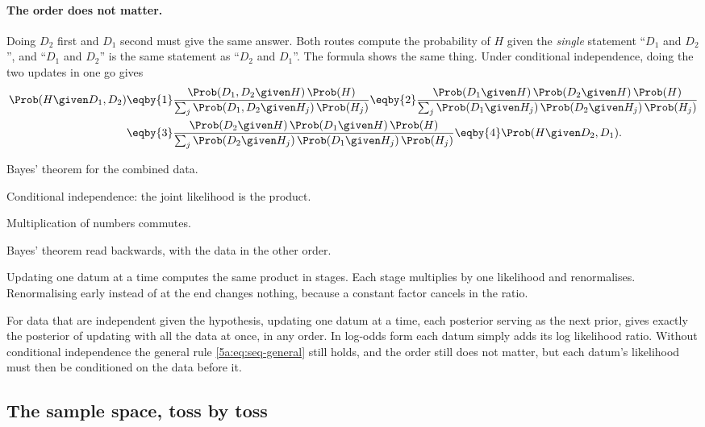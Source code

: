 \paragraph{The order does not matter.}
Doing $D_2$ first and $D_1$ second must give the same answer. Both routes compute
the probability of $H$ given the \emph{single} statement ``$D_1$ and $D_2$'', and
``$D_1$ and $D_2$'' is the same statement as ``$D_2$ and $D_1$''. The formula shows
the same thing. Under conditional independence, doing the two updates in one go
gives 
\begin{align*}
  \Prob(H\given D_1,D_2)
  &\eqby{1}\frac{\Prob(D_1,D_2\given H)\,\Prob(H)}{\sum_j\Prob(D_1,D_2\given H_j)\,\Prob(H_j)}
  \eqby{2}\frac{\Prob(D_1\given H)\,\Prob(D_2\given H)\,\Prob(H)}
              {\sum_j\Prob(D_1\given H_j)\,\Prob(D_2\given H_j)\,\Prob(H_j)}\\
  &\eqby{3}\frac{\Prob(D_2\given H)\,\Prob(D_1\given H)\,\Prob(H)}
              {\sum_j\Prob(D_2\given H_j)\,\Prob(D_1\given H_j)\,\Prob(H_j)}
  \eqby{4}\Prob(H\given D_2,D_1) .
\end{align*}
\begin{explain}
  \item Bayes' theorem for the combined data.
  \item Conditional independence: the joint likelihood is the product.
  \item Multiplication of numbers commutes.
  \item Bayes' theorem read backwards, with the data in the other order.
\end{explain}
Updating one datum at a time computes the same product in stages. Each stage
multiplies by one likelihood and renormalises. Renormalising early instead of at
the end changes nothing, because a constant factor cancels in the ratio.

\begin{keyidea}
For data that are independent given the hypothesis, updating one datum at a time,
each posterior serving as the next prior, gives exactly the posterior of updating
with all the data at once, in any order. In log-odds form each datum simply adds its
log likelihood ratio. Without conditional independence the general rule
\eqref{5a:eq:seq-general} still holds, and the order still does not matter, but each
datum's likelihood must then be conditioned on the data before it.
\end{keyidea}

\subsection{The sample space, toss by toss}

